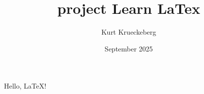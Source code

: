 \documentclass[]{article}
\title{project Learn LaTex}
\author{Kurt Krueckeberg}
\date{September 2025}
\begin{document}
\maketitle


\lipsum[1-3]
Hello, LaTeX!
\end{document}
